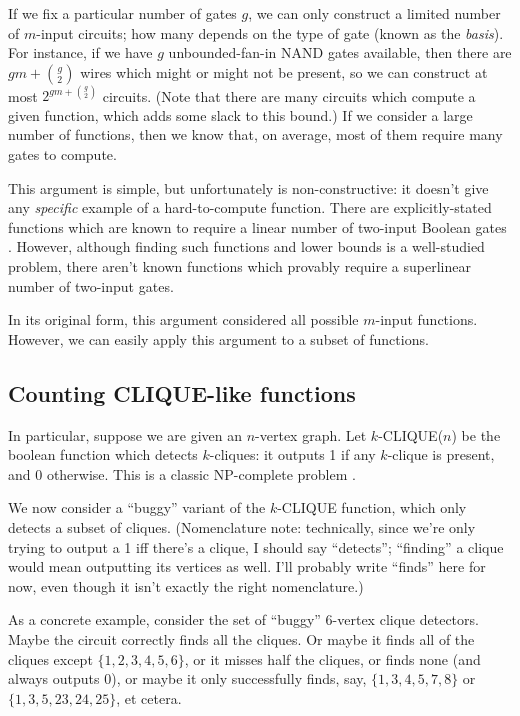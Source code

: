 \documentclass[12pt]{article}
\theoremstyle{definition}
\begin{document}
If we fix a particular number of gates $g$, we can only construct a limited
number of $m$-input circuits; how many depends on the type of gate (known as
the {\em basis}).
For instance,
if we have $g$ unbounded-fan-in NAND gates available, then there are
$gm + {g \choose 2}$ wires which might or might not be present, so 
we can construct at most $2^{gm + {g \choose 2}}$ circuits.
(Note that there are many circuits which compute a given function,
which adds some slack to this bound.) If we consider a large number of functions,
then we know that, on average, most of them require many gates to compute.

This argument is simple, but unfortunately is non-constructive: it doesn't give any
{\em specific} example of a hard-to-compute function.
There are explicitly-stated functions which are known to require
a linear number of two-input Boolean gates \cite{iwama2002explicit}.
However, although finding such functions and lower bounds is
a well-studied problem, there aren't known functions which provably require
a superlinear number of two-input gates.

In its original form, this argument considered all possible $m$-input functions.
However, we can easily apply this argument to a subset of functions.

\subsection{Counting CLIQUE-like functions}

In particular, suppose we are given an $n$-vertex graph.
Let $k$-CLIQUE($n$) be the boolean function which
detects $k$-cliques: it outputs 1 if any $k$-clique
is present, and 0 otherwise. This is a classic
NP-complete problem \cite{aaronson_pnp}.

We now consider a ``buggy'' variant of the $k$-CLIQUE function,
which only detects a subset of cliques. (Nomenclature note:
technically, since
we're only trying to output a 1 iff there's a clique, I should say
``detects''; ``finding'' a clique would mean outputting its
vertices as well. I'll probably write ``finds'' here for now,
even though it isn't exactly the right nomenclature.)

As a concrete example,
consider the set of ``buggy'' 6-vertex clique detectors.
Maybe the circuit correctly
finds all the cliques. Or maybe it finds all of the cliques except $\{1,2,3,4,5,6\}$,
or it misses half the cliques, or finds none (and always outputs 0), or maybe
it only successfully finds, say, $\{1,3,4,5,7,8\}$ or $\{1,3,5,23,24,25\}$, et cetera.
\end{document}

